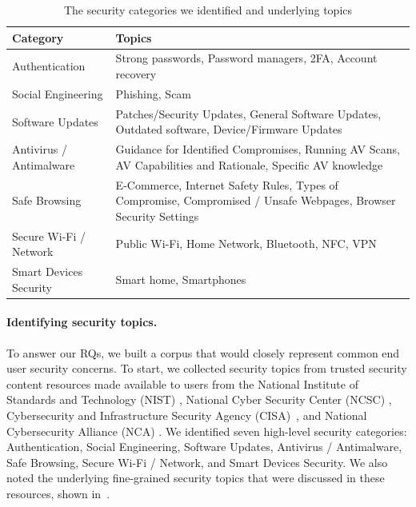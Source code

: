 \begin{table}[!htb]

    
    \centering
    \caption{The security categories we identified and underlying topics}

    \begin{tabular}{L{0.13\textwidth}L{0.27\textwidth}}
    \toprule
        \textbf{Category} & \textbf{Topics} \\ 
    \midrule
Authentication & Strong passwords, Password managers, 2FA, Account recovery  \\ 
Social Engineering & Phishing, Scam  \\ 
Software Updates & Patches/Security Updates, General Software Updates, Outdated software, Device/Firmware Updates\\ 
Antivirus / Antimalware & Guidance for Identified Compromises, Running AV Scans, AV Capabilities and Rationale, Specific AV knowledge \\ 
Safe Browsing & E-Commerce, Internet Safety Rules, Types of Compromise, Compromised / Unsafe Webpages, Browser Security Settings  \\ 
Secure Wi-Fi / Network & Public Wi-Fi, Home Network, Bluetooth, NFC, VPN \\ 
Smart Devices Security & Smart home, Smartphones  \\ 
    \bottomrule
    \end{tabular}
    \label{tab:categories-table}
    \vspace{-1em}
    
\end{table}

\paragraph{Identifying security topics.} To answer our RQs, we built a corpus that would closely represent common end user security concerns. To start, we collected security topics from trusted security content resources made available to users from the National Institute of Standards and Technology (NIST) \cite{NIST}, National Cyber Security Center (NCSC) \cite{NCSC}, Cybersecurity and Infrastructure Security Agency (CISA)~\cite{CISA}, and National Cybersecurity Alliance (NCA) \cite{NCA}. We identified seven high-level security categories: Authentication, Social Engineering, Software Updates, Antivirus / Antimalware, Safe Browsing, Secure Wi-Fi / Network, and Smart Devices Security. We also noted the underlying fine-grained security topics that were discussed in these resources, shown in~.

